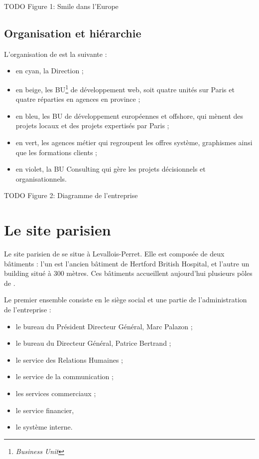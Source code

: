 TODO Figure 1: Smile dans l'Europe


\subsection{Organisation et hiérarchie}

L'organisation de \asmile{} est la suivante :

\begin{itemize}
	\item en cyan, la Direction ;
	\item en beige, les BU\footnote{\textit{Business Unit}} de développement web, soit quatre unités sur Paris et quatre réparties en agences en province ;
	\item en bleu, les BU de développement européennes et offshore, qui mènent des projets locaux et des projets expertisés par Paris ;
	\item en vert, les agences métier qui regroupent les offres système, \og{} graphismes \fg{} ainsi que les formations clients ;
	\item en violet, la BU Consulting qui gère les projets décisionnels et organisationnels.
\end{itemize}

TODO Figure 2: Diagramme de l'entreprise


\section{Le site parisien}

Le site parisien de \asmile{} se situe à Levallois-Perret.
Elle est composée de deux bâtiments : l'un est l'ancien bâtiment de Hertford British Hospital, et l'autre un building situé à 300 mètres.
Ces bâtiments accueillent aujourd'hui plusieurs pôles de \asmile{}.

Le premier ensemble consiste en le siège social et une partie de l'administration de l'entreprise :

\begin{itemize}
	\item le bureau du Président Directeur Général, Marc Palazon ;
	\item le bureau du Directeur Général, Patrice Bertrand ;
	\item le service des Relations Humaines ;
	\item le service de la communication ;
	\item les services commerciaux ;
	\item le service financier,
	\item le système interne.
\end{itemize}

